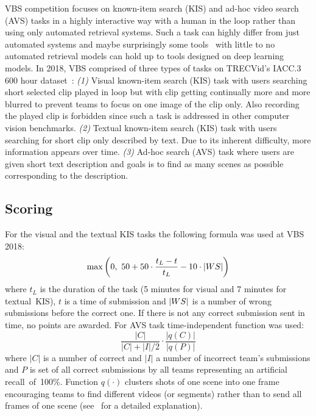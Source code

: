VBS competition focuses on known-item search (KIS) and ad-hoc video search (AVS) tasks in a highly interactive
way with a human in the loop rather than using only automated retrieval systems. Such a task can highly differ from just automated systems and maybe surprisingly some tools~\cite{Storyboard-Based_Interface,duane2018virtual} with little to no automated retrieval models can hold up to tools designed on deep learning models. In 2018, VBS comprised of three types of tasks on TRECVid's IACC.3 600 hour dataset~\cite{awad2016trecvid}: \textit{(1)} Visual known-item search (KIS) task with users searching short selected clip played in loop but with clip getting continually more and more blurred to prevent teams to focus on one image of the clip only. Also recording the played clip is forbidden since such a task is addressed in other computer vision benchmarks. \textit{(2)} Textual known-item search (KIS) task with users searching for short clip only described by text. Due to its inherent difficulty, more information appears over time. \textit{(3)} Ad-hoc search (AVS) task where users are given short text description and goals is to find as many scenes as possible corresponding to the description.

\subsection{Scoring}
For the visual and the textual KIS tasks the following formula was used at VBS 2018:
\begin{equation}
\max\left(0,\ 50 + 50\cdot\frac{t_L-t}{t_L} - 10\cdot\left|{WS}\right|\right)
\end{equation}
where $t_L$ is the duration of the task (5 minutes for visual and 7 minutes for textual~KIS), $t$ is a time of submission and $\left|{WS}\right|$ is a number of wrong submissions before the correct one. If there is not any correct submission sent in time, no points are awarded. For AVS task time-independent function was used:
\begin{equation}
\frac{|C|}{|C|+|I|/2}\cdot\frac{|q(C)|}{|q(P)|}
\end{equation}
where $|C|$ is a number of correct and $|I|$ a number of incorrect team's submissions and $P$ is set of all correct submissions by all teams representing an artificial recall~of~100\%. Function $q(\cdot)$ clusters shots of one scene into one frame encouraging teams to find different videos (or segments) rather than to send all frames of one scene (see~\cite{Lokoc-influential-trends} for a detailed explanation).

